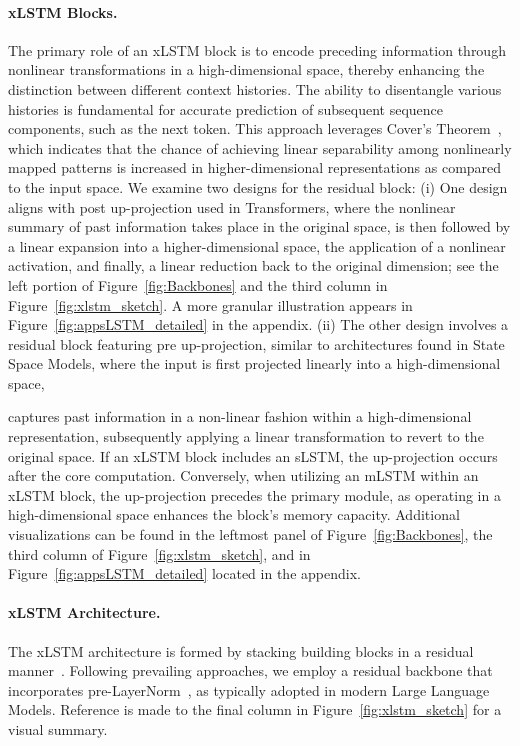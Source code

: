 \paragraph{xLSTM Blocks.}
\label{sec:xLSTMblock}
The primary role of an xLSTM block is to encode preceding information through nonlinear transformations in a high-dimensional space, thereby enhancing the distinction between different context histories. The ability to disentangle various histories is fundamental for accurate prediction of subsequent sequence components, such as the next token. This approach leverages Cover’s Theorem~\citep{Cover:65}, which indicates that the chance of achieving linear separability among nonlinearly mapped patterns is increased in higher-dimensional representations as compared to the input space. We examine two designs for the residual block: (i) One design aligns with post up-projection used in Transformers, where the nonlinear summary of past information takes place in the original space, is then followed by a linear expansion into a higher-dimensional space, the application of a nonlinear activation, and finally, a linear reduction back to the original dimension; see the left portion of Figure~\ref{fig:Backbones} and the third column in Figure~\ref{fig:xlstm_sketch}. A more granular illustration appears in Figure~\ref{fig:appsLSTM_detailed} in the appendix. (ii) The other design involves a residual block featuring pre up-projection, similar to architectures found in State Space Models, where the input is first projected linearly into a high-dimensional space,

captures past information in a non-linear fashion within a high-dimensional representation, subsequently applying a linear transformation to revert to the original space. If an xLSTM block includes an sLSTM, the up-projection occurs after the core computation. Conversely, when utilizing an mLSTM within an xLSTM block, the up-projection precedes the primary module, as operating in a high-dimensional space enhances the block’s memory capacity. Additional visualizations can be found in the leftmost panel of Figure~\ref{fig:Backbones}, the third column of Figure~\ref{fig:xlstm_sketch}, and in Figure~\ref{fig:appsLSTM_detailed} located in the appendix.

\paragraph{xLSTM Architecture. }
\label{sec:xLSTMarchitecure}
The xLSTM architecture is formed by stacking building blocks in a residual manner~\citep{Srivastava:15,He:16}. Following prevailing approaches, we employ a residual backbone that incorporates pre-LayerNorm~\citep{Ba:16b}, as typically adopted in modern Large Language Models. Reference is made to the final column in Figure~\ref{fig:xlstm_sketch} for a visual summary.

